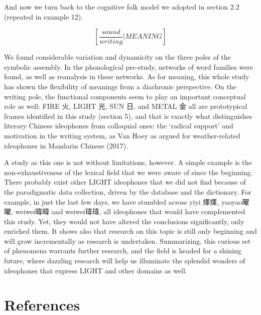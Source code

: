 \documentclass[12pt,article,oneside]{memoir}
\theoremstyle{definition}
\theoremstyle{definition}
\theoremstyle{definition}
\theoremstyle{remark}
\begin{document}
And now we turn back to the cognitive folk model we adopted in section
2.2 (repeated in example 12).

\[[\frac{sound}{writing}|MEANING]\]

We found considerable variation and dynamicity on the three poles of the
symbolic assembly. In the phonological pre-study, networks of word
families were found, as well as reanalysis in these networks. As for
meaning, this whole study has shown the flexibility of meanings from a
diachronic perspective. On the writing pole, the functional components
seem to play an important conceptual role as well: FIRE 火, LIGHT 光,
SUN 日, and METAL 金 all are prototypical frames identified in this
study (section 5), and that is exactly what distinguishes literary
Chinese ideophones from colloquial ones: the `radical support' and
motivation in the writing system, as Van Hoey as argued for
weather-related ideophones in Mandarin Chinese (2017).

A study as this one is not without limitations, however. A simple
example is the non-exhaustiveness of the lexical field that we were
aware of since the beginning. There probably exist other LIGHT
ideophones that we did not find because of the paradigmatic data
collection, driven by the database and the dictionary. For example, in
just the last few days, we have stumbled across yiyi 燡燡, yaoyao曜曜,
weiwei暐暐 and weiwei瑋瑋, all ideophones that would have complemented
this study. Yet, they would not have altered the conclusions
significantly, only enriched them. It shows also that research on this
topic is still only beginning and will grow incrementally as research is
undertaken. Summarizing, this curious set of phenomena warrants further
research, and the field is headed for a shining future, where dazzling
research will help us illuminate the splendid wonders of ideophones that
express LIGHT and other domains as well.

\section{References}\label{references}
\end{document}
